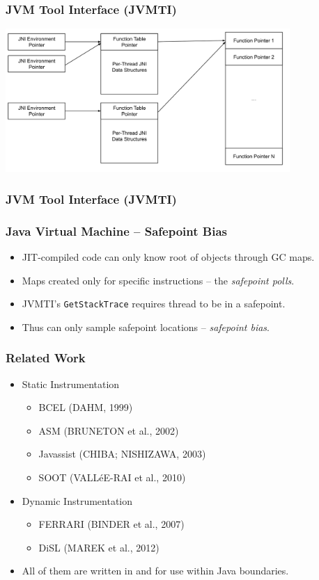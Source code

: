 \documentclass{beamer}
\begin{document}
\begin{frame}
\frametitle{JVM Tool Interface (JVMTI)}
\centering
\includegraphics[width=0.81\textwidth]{src/figure/jni_function_table.png}
\end{frame}


\begin{frame}
\frametitle{JVM Tool Interface (JVMTI)}

\end{frame}

\begin{frame}
\frametitle{Java Virtual Machine -- Safepoint Bias}
\begin{itemize}
\item JIT-compiled code can only know root of objects through GC maps.
\item Maps created only for specific instructions -- the \emph{safepoint polls}.
\item JVMTI's \lstinline{GetStackTrace} requires thread to be in a safepoint.
\item Thus can only sample safepoint locations -- \emph{safepoint bias}.
\end{itemize}
\end{frame}

\begin{frame}
\frametitle{Related Work}
\begin{itemize}
\item Static Instrumentation
\begin{itemize}
\item BCEL (DAHM, 1999)
\item ASM (BRUNETON et al., 2002)
\item Javassist (CHIBA; NISHIZAWA, 2003)
\item SOOT (VALLéE-RAI et al., 2010)
\end{itemize}
\item Dynamic Instrumentation
\begin{itemize}
\item FERRARI (BINDER et al., 2007)
\item DiSL (MAREK et al., 2012)
\end{itemize}
\item All of them are written in and for use within Java boundaries.
\end{itemize}
\end{frame}
\end{document}

